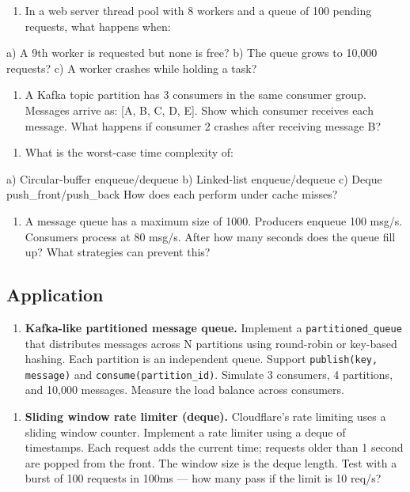 \begin{enumerate}
\item In a web server thread pool with 8 workers and a queue of 100 pending requests, what happens when:
\end{enumerate}
   a) A 9th worker is requested but none is free?
   b) The queue grows to 10,000 requests?
   c) A worker crashes while holding a task?

\begin{enumerate}
\item A Kafka topic partition has 3 consumers in the same consumer group. Messages arrive as: [A, B, C, D, E]. Show which consumer receives each message. What happens if consumer 2 crashes after receiving message B?
\end{enumerate}

\begin{enumerate}
\item What is the worst-case time complexity of:
\end{enumerate}
   a) Circular-buffer enqueue/dequeue
   b) Linked-list enqueue/dequeue
   c) Deque push\_front/push\_back
   How does each perform under cache misses?

\begin{enumerate}
\item A message queue has a maximum size of 1000. Producers enqueue 100 msg/s. Consumers process at 80 msg/s. After how many seconds does the queue fill up? What strategies can prevent this?
\end{enumerate}

\subsection{Application}

\begin{enumerate}
\item \textbf{Kafka-like partitioned message queue.} Implement a \texttt{partitioned\_queue} that distributes messages across N partitions using round-robin or key-based hashing. Each partition is an independent queue. Support \texttt{publish(key, message)} and \texttt{consume(partition\_id)}. Simulate 3 consumers, 4 partitions, and 10,000 messages. Measure the load balance across consumers.
\end{enumerate}

\begin{enumerate}
\item \textbf{Sliding window rate limiter (deque).} Cloudflare's rate limiting uses a sliding window counter. Implement a rate limiter using a deque of timestamps. Each request adds the current time; requests older than 1 second are popped from the front. The window size is the deque length. Test with a burst of 100 requests in 100ms — how many pass if the limit is 10 req/s?
\end{enumerate}

